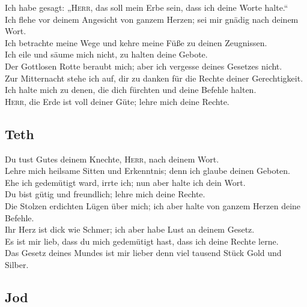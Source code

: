  Ich habe gesagt: „\textsc{Herr}, das soll mein Erbe
sein, dass ich deine Worte halte.``\\
 Ich flehe vor deinem Angesicht von ganzem Herzen; sei
mir gnädig nach deinem Wort.\\
 Ich betrachte meine Wege und kehre meine Füße zu deinen
Zeugnissen.\\
 Ich eile und säume mich nicht, zu halten deine Gebote.\\
 Der Gottlosen Rotte beraubt mich; aber ich vergesse
deines Gesetzes nicht.\\
 Zur Mitternacht stehe ich auf, dir zu danken für die
Rechte deiner Gerechtigkeit.\\
 Ich halte mich zu denen, die dich fürchten und deine
Befehle halten.\\
 \textsc{Herr}, die Erde ist voll deiner Güte; lehre mich
deine Rechte.

\hypertarget{teth}{%
\subsection{Teth}\label{teth}}

 Du tust Gutes deinem Knechte, \textsc{Herr}, nach deinem
Wort.\\
 Lehre mich heilsame Sitten und Erkenntnis; denn ich
glaube deinen Geboten.\\
 Ehe ich gedemütigt ward, irrte ich; nun aber halte ich
dein Wort.\\
 Du bist gütig und freundlich; lehre mich deine Rechte.\\
 Die Stolzen erdichten Lügen über mich; ich aber halte
von ganzem Herzen deine Befehle.\\
 Ihr Herz ist dick wie Schmer; ich aber habe Lust an
deinem Gesetz.\\
 Es ist mir lieb, dass du mich gedemütigt hast, dass ich
deine Rechte lerne.\\
 Das Gesetz deines Mundes ist mir lieber denn viel
tausend Stück Gold und Silber.

\hypertarget{jod}{%
\subsection{Jod}\label{jod}}

